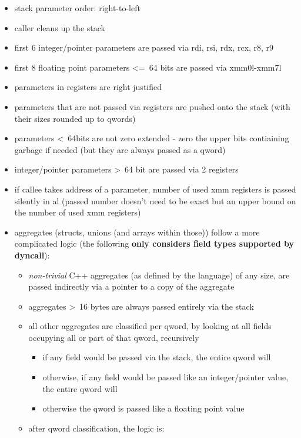 \begin{itemize}
\item stack parameter order: right-to-left
\item caller cleans up the stack
\item first 6 integer/pointer parameters are passed via rdi, rsi, rdx, rcx, r8, r9
\item first 8 floating point parameters \textless=\ 64 bits are passed via xmm0l-xmm7l
\item parameters in registers are right justified
\item parameters that are not passed via registers are pushed onto the stack (with their sizes rounded up to qwords)
\item parameters \textless\ 64bits are not zero extended - zero the upper bits contiaining garbage if needed (but they are always
passed as a qword)
\item integer/pointer parameters \textgreater\ 64 bit are passed via 2 registers
\item if callee takes address of a parameter, number of used xmm registers is passed silently in al (passed number doesn't need to be
exact but an upper bound on the number of used xmm registers)
\item aggregates (structs, unions (and arrays within those)) follow a more complicated logic (the following {\bf only considers field types supported by dyncall}):
\begin{itemize}
  \item {\it non-trivial} C++ aggregates (as defined by the language) of any size, are passed indirectly via a pointer to a copy of the aggregate
  \item aggregates \textgreater\ 16 bytes are always passed entirely via the stack
  \item all other aggregates are classified per qword, by looking at all fields occupying all or part of that qword, recursively
  \begin{itemize}
    \item if any field would be passed via the stack, the entire qword will
    \item otherwise, if any field would be passed like an integer/pointer value, the entire qword will
    \item otherwise the qword is passed like a floating point value
  \end{itemize}
  \item after qword classification, the logic is:
  \begin{itemize}

\end{itemize}
\end{itemize}
\end{itemize}
